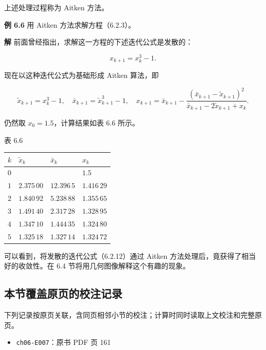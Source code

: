 \documentclass[
  10pt,
  fontset=fandol]{ctexart}
\newcounter{none} %
\providecommand{\tightlist}{%
  \setlength{\itemsep}{0pt}\setlength{\parskip}{0pt}}
\begin{document}
上述处理过程称为 Aitken 方法。

\textbf{例 6.6} 用 Aitken 方法求解方程（6.2.3）。

\textbf{解} 前面曾经指出，求解这一方程的下述迭代公式是发散的：

\[
x_{k+1}=x_k^3-1.
\tag{6.2.12}
\]

现在以这种迭代公式为基础形成 Aitken 算法，即

\[
\tilde{x}_{k+1}=x_k^3-1,\quad
\bar{x}_{k+1}=\tilde{x}_{k+1}^3-1,\quad
x_{k+1}=\bar{x}_{k+1}-\frac{(\bar{x}_{k+1}-\tilde{x}_{k+1})^2}{\bar{x}_{k+1}-2\tilde{x}_{k+1}+x_k}.
\]

仍然取 \(x_0=1.5\)，计算结果如表 6.6 所示。

表 6.6

{\def\LTcaptype{none} %
\begin{longtable}[]{@{}llll@{}}
\toprule\noalign{}
\(k\) & \(\tilde{x}_k\) & \(\bar{x}_k\) & \(x_k\) \\
\midrule\noalign{}
\endhead
\bottomrule\noalign{}
\endlastfoot
\(0\) & & & \(1.5\) \\
\(1\) & \(2.375\,00\) & \(12.396\,5\) & \(1.416\,29\) \\
\(2\) & \(1.840\,92\) & \(5.238\,88\) & \(1.355\,65\) \\
\(3\) & \(1.491\,40\) & \(2.317\,28\) & \(1.328\,95\) \\
\(4\) & \(1.347\,10\) & \(1.444\,35\) & \(1.324\,80\) \\
\(5\) & \(1.325\,18\) & \(1.327\,14\) & \(1.324\,72\) \\
\end{longtable}
}

可以看到，将发散的迭代公式（6.2.12）通过 Aitken 方法处理后，竟获得了相当好的收敛性。在 6.4 节将用几何图像解释这个有趣的现象。

\subsection{本节覆盖原页的校注记录}\label{ux672cux8282ux8986ux76d6ux539fux9875ux7684ux6821ux6ce8ux8bb0ux5f55}

下列记录按原页关联，含同页相邻小节的校注；计算时同时读取上文校注和完整原页。

\begin{itemize}
\tightlist
\item
  \texttt{ch06-E007}：原书 PDF 页 161
\end{itemize}
\end{document}
